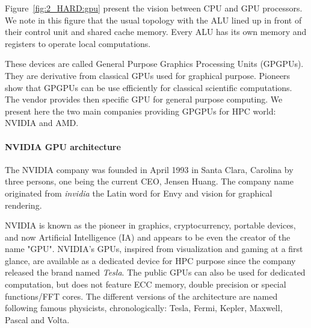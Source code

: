 Figure~\ref{fig:2_HARD:gpu} present the vision between CPU and GPU processors. 
We note in this figure that the usual topology with the ALU lined up in front of their control unit and shared cache memory. 
Every ALU has its own memory and registers to operate local computations. 

These devices are called General Purpose Graphics Processing Units (GPGPUs). 
They are derivative from classical GPUs used for graphical purpose.
Pioneers show that GPGPUs can be use efficiently for classical scientific computations.
The vendor provides then specific GPU for general purpose computing.  
We present here the two main companies providing GPGPUs for HPC world: NVIDIA and AMD.

\paragraph{NVIDIA GPU architecture}
The NVIDIA company was founded in April 1993 in Santa Clara, Carolina by three persons, one being the current CEO, Jensen Huang.
The company name originated from \textit{invidia} the Latin word for Envy and vision for graphical rendering. 

NVIDIA is known as the pioneer in graphics, cryptocurrency, portable devices, and now Artificial Intelligence (IA) and appears to be even the creator of the name "GPU".
NVIDIA's GPUs, inspired from visualization and gaming at a first glance, are available as a dedicated device for HPC purpose since the company released the brand named \textit{Tesla}. 
The public GPUs can also be used for dedicated computation, but does not feature ECC memory, double precision or special functions/FFT cores. 
The different versions of the architecture are named following famous physicists, chronologically: Tesla, Fermi, Kepler, Maxwell, Pascal and Volta.

